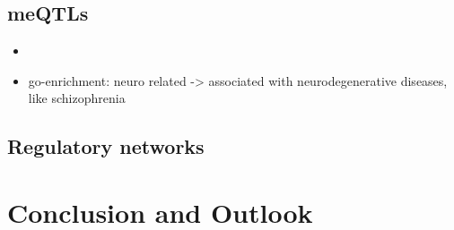 \documentclass[a4paper,12pt,twoside,openright]{report}
\begin{document}
\section{meQTLs}
\label{Discussion:meQTLs}
\begin{itemize}
\item 
\item go-enrichment: neuro related -> associated with neurodegenerative diseases\cite{}, like schizophrenia\cite{10.3389/fpsyt.2015.00183}
\end{itemize}

\section{Regulatory networks}
\label{Discussion:Regulatory networks}

\newpage
\chapter{Conclusion and Outlook}
\label{Conclusion and Outlook}

\newpage
\listoffigures
\listoftables

{}

\end{document}
